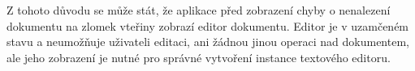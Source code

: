 Z tohoto důvodu se může stát, že aplikace před zobrazení chyby o nenalezení dokumentu na zlomek vteřiny zobrazí editor dokumentu.
Editor je v uzamčeném stavu a neumožňuje uživateli editaci, ani žádnou jinou operaci nad dokumentem, ale jeho zobrazení je nutné pro správné vytvoření instance textového editoru.
